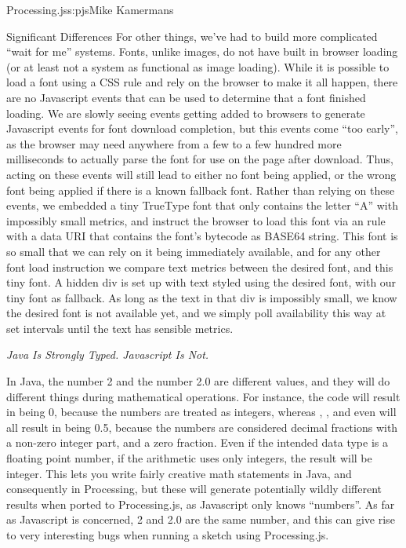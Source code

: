 \begin{aosachapter}{Processing.js}{s:pjs}{Mike Kamermans}
\begin{aosasect1}{Significant Differences}
For other things, we've had to build more complicated ``wait for me''
systems. Fonts, unlike images, do not have built in browser loading
(or at least not a system as functional as image loading). While it is
possible to load a font using a CSS  rule and rely on
the browser to make it all happen, there are no Javascript events that
can be used to determine that a font finished loading. We are slowly
seeing events getting added to browsers to generate Javascript events
for font download completion, but this events come ``too early'', as
the browser may need anywhere from a few to a few hundred more
milliseconds to actually parse the font for use on the page after
download. Thus, acting on these events will still lead to either no
font being applied, or the wrong font being applied if there is a
known fallback font. Rather than relying on these events, we embedded
a tiny TrueType font that only contains the letter ``A'' with
impossibly small metrics, and instruct the browser to load this font
via an  rule with a data URI that contains the font's
bytecode as BASE64 string. This font is so small that we can rely on
it being immediately available, and for any other font load
instruction we compare text metrics between the desired font, and this
tiny font. A hidden div is set up with text styled using the desired
font, with our tiny font as fallback. As long as the text in that div
is impossibly small, we know the desired font is not available yet,
and we simply poll availability this way at set intervals until the
text has sensible metrics.

\emph{Java Is Strongly Typed. Javascript Is Not.}

In Java, the number 2 and the number 2.0 are different values, and
they will do different things during mathematical operations. For
instance, the code  will result in  being 0,
because the numbers are treated as integers, whereas ,
, and even  will all result in
 being 0.5, because the numbers are considered decimal
fractions with a non-zero integer part, and a zero fraction. Even if
the intended data type is a floating point number, if the arithmetic
uses only integers, the result will be integer. This lets you write
fairly creative math statements in Java, and consequently in
Processing, but these will generate potentially wildly different
results when ported to Processing.js, as Javascript only knows
``numbers''. As far as Javascript is concerned, 2 and 2.0 are the same
number, and this can give rise to very interesting bugs when running a
sketch using Processing.js.


\end{aosasect1}
\end{aosachapter}
